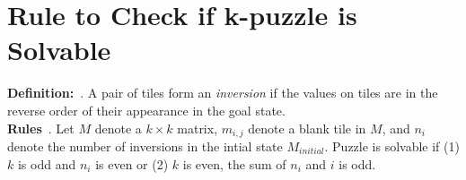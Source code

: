 \documentclass[runningheads]{llncs}
\begin{document}
\section{Rule to Check if k-puzzle is Solvable}
\textbf{Definition:}~\cite{princeton_computer_science_8-puzzle_nodate}. A pair of tiles form an \textit{inversion} if the values on tiles are in the reverse order of their appearance in the goal state. \\
\textbf{Rules}~\cite{princeton_computer_science_8-puzzle_nodate}. Let \( M \) denote a \( k \times k \) matrix, \( m_{i, j} \) denote a blank tile in \( M \), and \( n_i \) denote the number of inversions in the intial state \( M_{initial} \). Puzzle is solvable if (1) \( k \) is odd and \( n_i \) is even or (2) \( k \) is even, the sum of \(n_i \) and \( i \) is odd.



\end{document}
